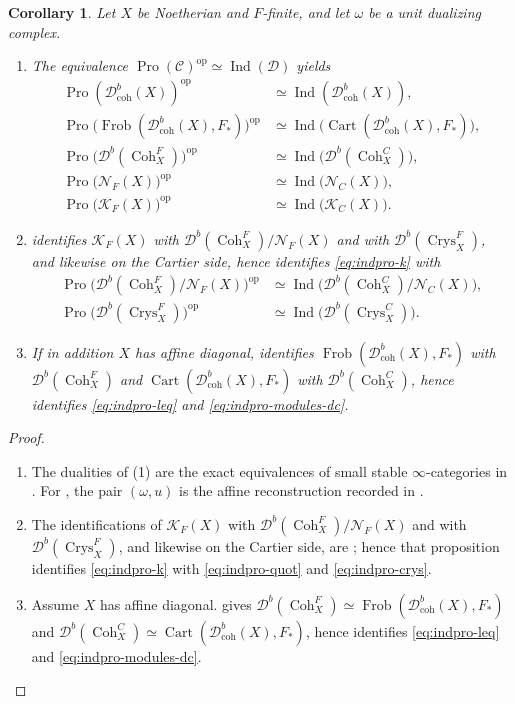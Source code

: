 \documentclass[11pt]{amsart}
\newcommand{\cC}{\mathcal{C}}
\newcommand{\cD}{\mathcal{D}}
\newcommand{\cN}{\mathcal{N}}
\newcommand{\Cart}{\operatorname{Cart}}
\newcommand{\op}{{\operatorname{op}}}
\newcommand{\Coh}{\operatorname{{Coh}}}
\newcommand{\Pro}{\operatorname{Pro}}
\newcommand{\Ind}{\operatorname{Ind}}
\newcommand{\Crys}{\operatorname{Crys}}
\newcommand{\Frob}{\operatorname{Frob}}
\newcommand{\Dbc}{\mathcal D^b_{\mathrm{coh}}}
\newcommand{\Db}{\mathcal D^b}
\newcommand{\KF}{\mathcal K_F}
\newcommand{\KC}{\mathcal K_C}
\theoremstyle{plain}
\newtheorem{corollary}[corollary]{Corollary}
\theoremstyle{definition}
\numberwithin{equation}{section}
\begin{document}
\begin{corollary}\label{cor:indpro-modules}
Let $X$ be Noetherian and $F$-finite, and let $\omega$ be a unit dualizing complex.
\begin{enumerate}
\item
The equivalence $\Pro(\cC)^{\op}\simeq\Ind(\cD)$ yields
\begin{align}
 \Pro(\Dbc(X))^{\op}
  &\simeq
 \Ind(\Dbc(X)),\label{eq:indpro-dbc}\\
 \Pro\bigl(\Frob(\Dbc(X),F_*)\bigr)^{\op}
  &\simeq
 \Ind\bigl(\Cart(\Dbc(X),F_*)\bigr),\label{eq:indpro-leq}\\
 \Pro\bigl(\Db(\Coh^F_X)\bigr)^{\op}
  &\simeq
 \Ind\bigl(\Db(\Coh^C_X)\bigr),\label{eq:indpro-modules-dc}\\
 \Pro\bigl(\cN_F(X)\bigr)^{\op}
  &\simeq
 \Ind\bigl(\cN_C(X)\bigr),\label{eq:indpro-nil}\\
 \Pro\bigl(\KF(X)\bigr)^{\op}
  &\simeq
 \Ind\bigl(\KC(X)\bigr).\label{eq:indpro-k}
\end{align}
\item
{} identifies $\KF(X)$ with $\Db(\Coh^F_X)/\cN_F(X)$ and with $\Db(\Crys^F_X)$, and likewise on the Cartier side, hence identifies \eqref{eq:indpro-k} with
\begin{align}
 \Pro\bigl(\Db(\Coh^F_X)/\cN_F(X)\bigr)^{\op}
  &\simeq
 \Ind\bigl(\Db(\Coh^C_X)/\cN_C(X)\bigr),\label{eq:indpro-quot}\\
 \Pro\bigl(\Db(\Crys^F_X)\bigr)^{\op}
  &\simeq
 \Ind\bigl(\Db(\Crys^C_X)\bigr).\label{eq:indpro-crys}
\end{align}
\item
If in addition $X$ has affine diagonal,  identifies $\Frob(\Dbc(X),F_*)$ with $\Db(\Coh^F_X)$ and $\Cart(\Dbc(X),F_*)$ with $\Db(\Coh^C_X)$, hence identifies \eqref{eq:indpro-leq} and \eqref{eq:indpro-modules-dc}.
\end{enumerate}
\end{corollary}
\begin{proof}
\begin{enumerate}
\item
The dualities of \textup{(1)} are the exact equivalences of small stable $\infty$-categories in .
For , the pair $(\omega,u)$ is the affine reconstruction recorded in .
\item
The identifications of $\KF(X)$ with $\Db(\Coh^F_X)/\cN_F(X)$ and with $\Db(\Crys^F_X)$, and likewise on the Cartier side, are ; hence that proposition identifies \eqref{eq:indpro-k} with \eqref{eq:indpro-quot} and \eqref{eq:indpro-crys}.
\item
Assume $X$ has affine diagonal.
 gives $\Db(\Coh^F_X)\simeq\Frob(\Dbc(X),F_*)$ and $\Db(\Coh^C_X)\simeq\Cart(\Dbc(X),F_*)$, hence identifies \eqref{eq:indpro-leq} and \eqref{eq:indpro-modules-dc}.
\end{enumerate}
\end{proof}
\end{document}
